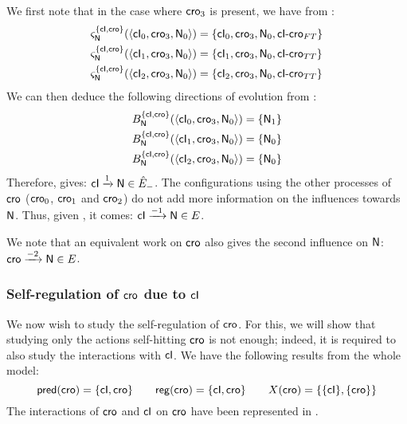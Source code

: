 We first note that in the case where $\mathsf{cro}_3$ is present, we have from :
\begin{align*}
  \varsigma_{\mathsf{N}}^{\{ \mathsf{cI}, \mathsf{cro} \}}(\langle \mathsf{cI}_0, \mathsf{cro}_3, \mathsf{N}_0 \rangle)
    &= \{ \mathsf{cI}_0, \mathsf{cro}_3, \mathsf{N}_0, \mathsf{cI\mbox{-}cro}_{FT} \} \\
  \varsigma_{\mathsf{N}}^{\{ \mathsf{cI}, \mathsf{cro} \}}(\langle \mathsf{cI}_1, \mathsf{cro}_3, \mathsf{N}_0 \rangle)
    &= \{ \mathsf{cI}_1, \mathsf{cro}_3, \mathsf{N}_0, \mathsf{cI\mbox{-}cro}_{TT} \} \\
  \varsigma_{\mathsf{N}}^{\{ \mathsf{cI}, \mathsf{cro} \}}(\langle \mathsf{cI}_2, \mathsf{cro}_3, \mathsf{N}_0 \rangle)
    &= \{ \mathsf{cI}_2, \mathsf{cro}_3, \mathsf{N}_0, \mathsf{cI\mbox{-}cro}_{TT} \}
\end{align*}
We can then deduce the following directions of evolution from :
\begin{align*}
  B_{\mathsf{N}}^{\{ \mathsf{cI}, \mathsf{cro} \}}(\langle \mathsf{cI}_0, \mathsf{cro}_3, \mathsf{N}_0 \rangle) &= \{ \mathsf{N}_1 \} \\
  B_{\mathsf{N}}^{\{ \mathsf{cI}, \mathsf{cro} \}}(\langle \mathsf{cI}_1, \mathsf{cro}_3, \mathsf{N}_0 \rangle) &= \{ \mathsf{N}_0 \} \\
  B_{\mathsf{N}}^{\{ \mathsf{cI}, \mathsf{cro} \}}(\langle \mathsf{cI}_2, \mathsf{cro}_3, \mathsf{N}_0 \rangle) &= \{ \mathsf{N}_0 \}
\end{align*}
Therefore,  gives: $\mathsf{cI} \xrightarrow{1} \mathsf{N} \in \hat{E}_-$.
The configurations using the other processes of $\mathsf{cro}$ ($\mathsf{cro}_0$, $\mathsf{cro}_1$ and $\mathsf{cro}_2$)
do not add more information on the influences towards $\mathsf{N}$.
Thus, given , it comes: $\mathsf{cI} \xrightarrow{- 1} \mathsf{N} \in E$.

We note that an equivalent work on $\mathsf{cro}$ also gives the second influence on $\mathsf{N}$:
$\mathsf{cro} \xrightarrow{- 2} \mathsf{N} \in E$.



\subsubsection{Self-regulation of $\mathsf{cro}$ due to $\mathsf{cI}$}

We now wish to study the self-regulation of $\mathsf{cro}$.
For this, we will show that studying only the actions self-hitting $\mathsf{cro}$ is not enough;
indeed, it is required to also study the interactions with $\mathsf{cI}$.
We have the following results from the whole model:
\[\mathsf{pred}(\mathsf{cro}) = \{ \mathsf{cI}, \mathsf{cro} \} \qquad
  \mathsf{reg}({\mathsf{cro}}) = \{ \mathsf{cI}, \mathsf{cro} \} \qquad
  X(\mathsf{cro}) = \{ \{ \mathsf{cI} \}, \{ \mathsf{cro} \} \}\]
The interactions of $\mathsf{cro}$ and $\mathsf{cI}$ on $\mathsf{cro}$ have been represented in
.

